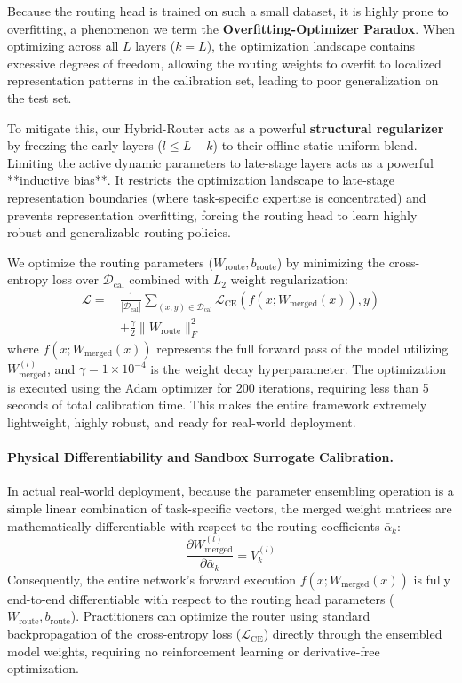 Because the routing head is trained on such a small dataset, it is highly prone to overfitting, a phenomenon we term the \textbf{Overfitting-Optimizer Paradox}. When optimizing across all $L$ layers ($k=L$), the optimization landscape contains excessive degrees of freedom, allowing the routing weights to overfit to localized representation patterns in the calibration set, leading to poor generalization on the test set.

To mitigate this, our Hybrid-Router acts as a powerful \textbf{structural regularizer} by freezing the early layers ($l \le L-k$) to their offline static uniform blend. Limiting the active dynamic parameters to late-stage layers acts as a powerful **inductive bias**. It restricts the optimization landscape to late-stage representation boundaries (where task-specific expertise is concentrated) and prevents representation overfitting, forcing the routing head to learn highly robust and generalizable routing policies. 

We optimize the routing parameters ($W_{\text{route}}, b_{\text{route}}$) by minimizing the cross-entropy loss over $\mathcal{D}_{\text{cal}}$ combined with $L_2$ weight regularization:
\begin{equation}
\begin{aligned}
    \mathcal{L} = \, &\frac{1}{|\mathcal{D}_{\text{cal}}|} \sum_{(x, y) \in \mathcal{D}_{\text{cal}}} \mathcal{L}_{\text{CE}}(f(x; W_{\text{merged}}(x)), y) \\
    &+ \frac{\gamma}{2} \|W_{\text{route}}\|_F^2
\end{aligned}
\end{equation}
where $f(x; W_{\text{merged}}(x))$ represents the full forward pass of the model utilizing $W_{\text{merged}}^{(l)}$, and $\gamma = 1 \times 10^{-4}$ is the weight decay hyperparameter. The optimization is executed using the Adam optimizer for 200 iterations, requiring less than 5 seconds of total calibration time. This makes the entire framework extremely lightweight, highly robust, and ready for real-world deployment.

\paragraph{Physical Differentiability and Sandbox Surrogate Calibration.}
In actual real-world deployment, because the parameter ensembling operation is a simple linear combination of task-specific vectors, the merged weight matrices are mathematically differentiable with respect to the routing coefficients $\bar{\alpha}_k$:
\begin{equation}
    \frac{\partial W_{\text{merged}}^{(l)}}{\partial \bar{\alpha}_k} = V_k^{(l)}
\end{equation}
Consequently, the entire network's forward execution $f(x; W_{\text{merged}}(x))$ is fully end-to-end differentiable with respect to the routing head parameters ($W_{\text{route}}, b_{\text{route}}$). Practitioners can optimize the router using standard backpropagation of the cross-entropy loss ($\mathcal{L}_{\text{CE}}$) directly through the ensembled model weights, requiring no reinforcement learning or derivative-free optimization.

